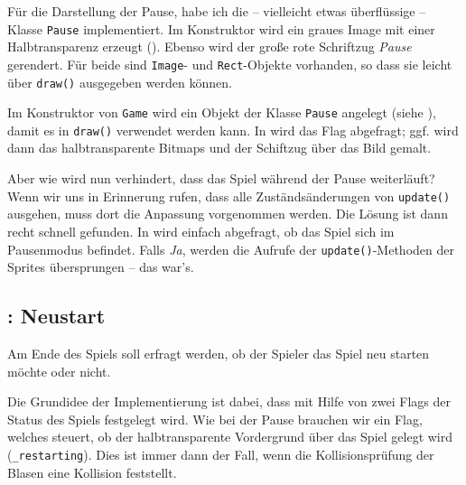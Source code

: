 
Für die Darstellung der Pause, habe ich die -- vielleicht etwas überflüssige -- Klasse \texttt{Pause} implementiert. Im Konstruktor wird ein graues Image mit einer Halbtransparenz erzeugt (). Ebenso wird der große rote Schriftzug \emph{Pause} gerendert. Für beide sind \texttt{Image}- und \texttt{Rect}-Objekte vorhanden, so dass sie leicht über \texttt{draw()} ausgegeben werden können.


Im Konstruktor von \texttt{Game} wird ein Objekt der Klasse \texttt{Pause} angelegt (siehe ), damit es in \texttt{draw()} verwendet werden kann. In  wird das Flag abgefragt; ggf. wird dann das halbtransparente Bitmaps und der Schiftzug über das Bild gemalt.


Aber wie wird nun verhindert, dass das Spiel während der Pause weiterläuft? Wenn wir uns in Erinnerung rufen, dass alle Zuständsänderungen von \texttt{update()} ausgehen, muss dort die Anpassung vorgenommen werden. Die Lösung ist dann recht schnell gefunden. In  wird einfach abgefragt, ob das Spiel sich im Pausenmodus befindet. Falls \emph{Ja}, werden die Aufrufe der \texttt{update()}-Methoden der Sprites übersprungen -- das war's.




\subsection{: Neustart}
 Am Ende des Spiels soll erfragt werden, ob der Spieler das Spiel neu starten möchte oder nicht.
\er

Die Grundidee der Implementierung ist dabei, dass mit Hilfe von zwei Flags der Status des Spiels festgelegt wird. Wie bei der Pause brauchen wir ein Flag, welches steuert, ob der halbtransparente Vordergrund über das Spiel gelegt wird (\texttt{\_restarting}). Dies ist immer dann der Fall, wenn die Kollisionsprüfung der Blasen eine Kollision feststellt. 

